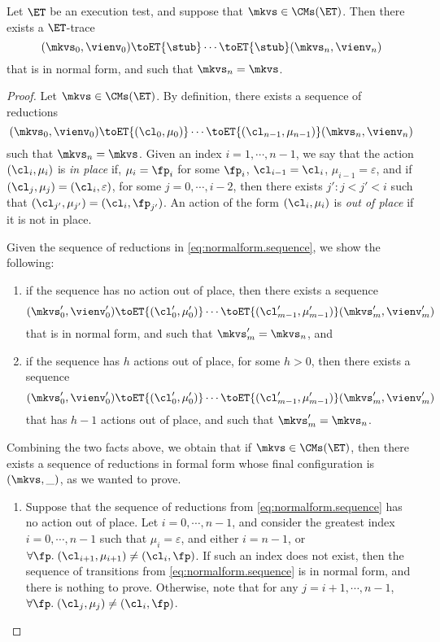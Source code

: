 \begin{proposition}
\label{prop:et.normalform}
Let $\ET$ be an execution test, and suppose that $\mkvs \in \CMs(\ET)$. Then there exists a $\ET$-trace  
\[
(\mkvs_0, \vienv_0) \toET{\stub} \cdots \toET{\stub} (\mkvs_n, \vienv_{n})
\]
that is in normal form, and such that $\mkvs_{n} = \mkvs$.
\end{proposition}
\begin{proof}
Let $\mkvs \in \CMs(\ET)$. By definition, there exists a sequence of reductions 
\begin{equation}
\label{eq:normalform.sequence}
(\mkvs_{0}, \vienv_{0}) \toET{(\cl_0, \mu_0)} \cdots \toET{(\cl_{n-1}, \mu_{n-1})} (\mkvs_n, \vienv_{n})
\end{equation}
such that $\mkvs_{n} = \mkvs$. Given an index $i = 1,\cdots, n-1$, we say that the action $(\cl_{i}, \mu_{i})$ is \emph{in place} 
if, $\mu_{i} = \fp_{i}$ for some $\fp_{i}$, $\cl_{i-1} = \cl_{i}$, $\mu_{i-1} = \varepsilon$, and if $(\cl_{j}, \mu_{j}) = (\cl_{i}, \varepsilon)$, 
for some  $j = 0,\cdots, i-2$, then there exists $j': j < j' < i$ such that $(\cl_{j'}, \mu_{j'}) = (\cl_i, \fp_{j'})$. An action of the 
form $(\cl_{i}, \mu_{i})$ is \emph{out of place} if it is not in place. 

Given the sequence of reductions in \cref{eq:normalform.sequence}, we show the following: 
\begin{enumerate}
\item if the sequence has no action out of place, then there exists a sequence 
\[
(\mkvs'_{0}, \vienv'_{0}) \toET{(\cl'_{0}, \mu'_{0})} \cdots \toET{(\cl'_{m-1}, \mu'_{m-1})} (\mkvs'_{m}, \vienv'_{m})
\]
that is in normal form, and such that $\mkvs'_{m} = \mkvs_{n}$, and 
\item if the sequence has $h$ actions out of place, for some $h > 0$, then there exists a sequence 
\[
(\mkvs'_{0}, \vienv'_{0}) \toET{(\cl'_{0}, \mu'_{0})} \cdots \toET{(\cl'_{m-1}, \mu'_{m-1})} (\mkvs'_{m}, \vienv'_{m})
\]
that has $h-1$ actions out of place, and such that $\mkvs'_{m} = \mkvs_{n}$.
\end{enumerate}
Combining the two facts above, we obtain that if $\mkvs \in \CMs(\ET)$, then there exists a sequence of reductions in formal form whose final 
configuration is $(\mkvs, \_)$, as we wanted to prove.

\begin{enumerate}
\item 
Suppose that the sequence of reductions from \cref{eq:normalform.sequence} has no action out of place. 
Let $i=0,\cdots, n-1$, and consider the greatest index $i=0,\cdots, n-1$ such that  
$\mu_{i} = \varepsilon$, and either $i = n-1$, or 
$\forall \fp.\; (\cl_{i+1}, \mu_{i+1}) \neq (\cl_{i}, \fp)$. 
If such an index does not exist, then the sequence of transitions from \cref{eq:normalform.sequence} is in 
normal form, and there is nothing to prove. Otherwise, note that for any $j = i+1,\cdots, n-1$, 
$\forall \fp.\;(\cl_{j}, \mu_{j}) \neq (\cl_{i}, \fp)$. 


\end{enumerate}
\end{proof}
